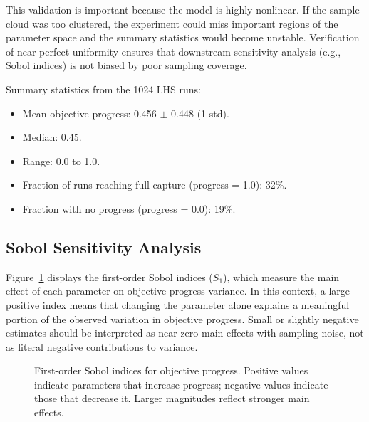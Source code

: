\documentclass{assignment}
\begin{document}
This validation is important because the model is highly nonlinear. If the sample cloud was too clustered, the experiment could miss important regions of the parameter space and the summary statistics would become unstable. Verification of near-perfect uniformity ensures that downstream sensitivity analysis (e.g., Sobol indices) is not biased by poor sampling coverage.

Summary statistics from the 1024 LHS runs:
\begin{itemize}
  \item Mean objective progress: 0.456 $\pm$ 0.448 (1 std).
  \item Median: 0.45.
  \item Range: 0.0 to 1.0.
  \item Fraction of runs reaching full capture (progress = 1.0): 32\%.
  \item Fraction with no progress (progress = 0.0): 19\%.
\end{itemize}

\subsection{Sobol Sensitivity Analysis}

Figure~\ref{fig:sobol_s1} displays the first-order Sobol indices ($S_1$), which measure the main effect of each parameter on objective progress variance. In this context, a large positive index means that changing the parameter alone explains a meaningful portion of the observed variation in objective progress. Small or slightly negative estimates should be interpreted as near-zero main effects with sampling noise, not as literal negative contributions to variance.

\begin{figure}[h]
  \centering
  \caption{First-order Sobol indices for objective progress. Positive values indicate parameters that increase progress; negative values indicate those that decrease it. Larger magnitudes reflect stronger main effects.}
  \label{fig:sobol_s1}
\end{figure}
\end{document}
